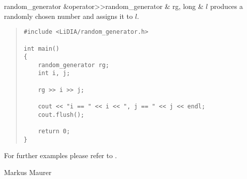 \begin{fcode}{random_generator &}{operator>>}{random_generator & rg, long & $l$}
  produces a randomly chosen number and assigns it to $l$.
\end{fcode}









\EXAMPLES

\begin{quote}
\begin{verbatim}
#include <LiDIA/random_generator.h>

int main()
{
    random_generator rg;
    int i, j;

    rg >> i >> j;

    cout << "i == " << i << ", j == " << j << endl;
    cout.flush();

    return 0;
}
\end{verbatim}
\end{quote}

For further examples please refer to .



\AUTHOR
Markus Maurer
